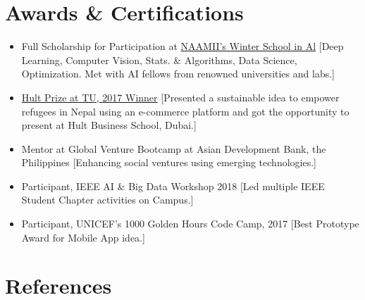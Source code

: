 \documentclass{resumex}
\begin{document}
\section{Awards \& Certifications  }
\begin{itemize}
    
\item {Full Scholarship for Participation at \href{https://1nepalschool.naamii.com.np/}{NAAMII's Winter School in Al}}
[Deep Learning, Computer Vision, Stats. \& Algorithms, Data Science, Optimization. Met with AI fellows from renowned universities and labs.] 


\item {\href{https://glocalkhabar.com/hult-prize-tu-winner-team-aegis-social-entrepreneurship/}{Hult Prize at TU, 2017 Winner}}
[Presented a sustainable idea to empower refugees in Nepal using an e-commerce platform and got the opportunity to present at Hult Business School, Dubai.]

\item {Mentor at Global Venture Bootcamp at Asian Development Bank, the Philippines}
[Enhancing social ventures using emerging technologies.]

\item {Participant, IEEE AI \& Big Data Workshop 2018}
[Led multiple IEEE Student Chapter activities on Campus.]

\item{Participant, UNICEF's 1000 Golden Hours Code Camp, 2017}
[Best Prototype Award for Mobile App idea.]
\end{itemize}

\vspace{5mm}


\section{References}
\end{document}
